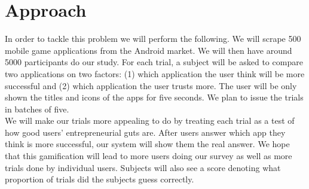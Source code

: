 \section{Approach}

In order to tackle this problem we will perform the following. We will scrape 500 mobile game applications from the Android market. We will then have around 5000 participants do our study. For each trial, a subject will be asked to compare two applications on two factors: (1) which application the user think will be more successful and (2) which application the user trusts more. The user will be only shown the titles and icons of the apps for five seconds. We plan to issue the trials in batches of five. \\

We will make our trials more appealing to do by treating each trial as a test of how good users' entrepreneurial guts are. After users answer which app they think is more successful, our system will show them the real answer. We hope that this gamification will lead to more users doing our survey as well as more trials done by individual users. Subjects will also see a score denoting what proportion of trials did the subjects guess correctly.

